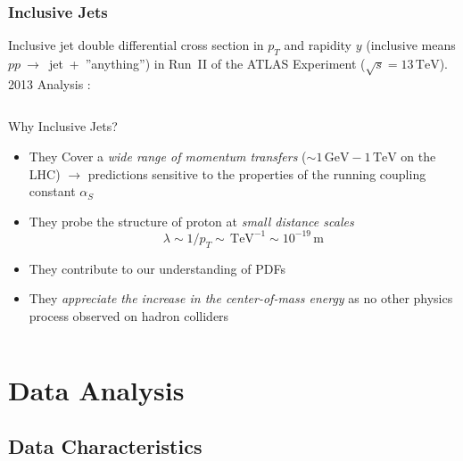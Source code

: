 \documentclass[compress]{beamer}
\newcommand{\GeV}{\,\text{GeV}}
\newcommand{\TeV}{\,\text{TeV}}
\newcommand{\pt}{p_{T}}
\begin{document}
\begin{frame}
\frametitle{Inclusive Jets} 
\scriptsize
Inclusive jet double differential cross section in $\pt$ and rapidity
$y$ (inclusive means $pp~\rightarrow$~jet~+~''anything'') in Run~II of the ATLAS
Experiment ($\sqrt{s}=13\TeV$).
2013 Analysis {}:
\begin{columns}[onlytextwidth]
  \begin{column}{0.5\textwidth}
    \begin{figure}[b]
      \centering
      \texttt{[image: \{../PrezentationATLASmeeting/ATLASinclusive04]}.png}
    \end{figure}
  \end{column}
  \begin{column}{0.5\textwidth}
    \begin{block}{Why Inclusive Jets?}
      \begin{itemize}
        \item They Cover a \textit{\color{red}wide range of momentum transfers}
          ($\sim 1 \GeV - 1 \TeV$ on the LHC) $\rightarrow$ predictions sensitive to
          the properties of the running coupling constant $\alpha_S$
        \item They probe the structure of proton at \textit{\color{red}small
        distance scales}
        \begin{equation*}
          \lambda \sim 1/\pt \sim \TeV^{-1} \sim 10^{-19}\,\text{m}
        \end{equation*}
        \item They contribute to our understanding of PDFs
        \item They \textit{\color{red}appreciate the increase in the center-of-mass
        energy} as no other physics process observed on hadron colliders
      \end{itemize}
    \end{block}
  \end{column}
\end{columns}
\end{frame}


\section{Data Analysis}
\subsection{Data Characteristics}
\end{document}
